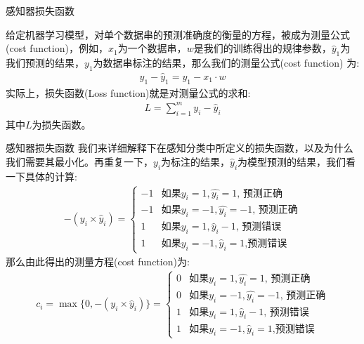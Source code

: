 \documentclass[handout]{ctexbeamer}
\begin{document}
\begin{frame}{感知器损失函数}
\begin{definition}
	给定机器学习模型，对单个数据串的预测准确度的衡量的方程，被成为测量公式(cost function)，例如，$x_1$为一个数据串，$w$是我们的训练得出的规律参数，$\hat{y}_1$为我们预测的结果，$y_1$为数据串标注的结果，那么我们的测量公式(cost function) 为:
	\begin{align*}
		y_1 - \hat{y}_1 = y_1 - x_1 \cdot w 
	\end{align*}
	实际上，损失函数(Loss function)就是对测量公式的求和:
	\begin{align*}
		L = \sum_{i=1}^m y_i - \hat{y}_i 
	\end{align*}
	其中$L$为损失函数。
\end{definition}
\end{frame}


\begin{frame}{感知器损失函数}
我们来详细解释下在感知分类中所定义的损失函数，以及为什么我们需要其最小化。再重复一下，$y_i$为标注的结果，$\hat{y}_i$为模型预测的结果，我们看一下具体的计算:
		\begin{align*}
				-(y_i \times \hat{y}_i) = \begin{cases}
					-1 & \text{如果$y_i = 1, \hat{y_i} = 1$, 预测正确} \\
					-1 & \text{如果$y_i = -1, \hat{y_i} = -1$, 预测正确} \\
					1 & \text{如果$y_i = 1, \hat{y}_i  -1$, 预测错误} \\
					1 & \text{如果$y_i = -1, \hat{y}_i = 1$,预测错误} 
				\end{cases}
		\end{align*}
	那么由此得出的测量方程(cost function)为:
		\begin{align*}
				c_i = \max \{ 0, -(y_i \times \hat{y}_i) \}  = \begin{cases}
					0 & \text{如果$y_i = 1, \hat{y_i} = 1$, 预测正确} \\
					0 & \text{如果$y_i = -1, \hat{y_i} = -1$, 预测正确} \\
					1 & \text{如果$y_i = 1, \hat{y}_i  -1$, 预测错误} \\
					1 & \text{如果$y_i = -1, \hat{y}_i = 1$,预测错误} 
				\end{cases}
		\end{align*}	
\end{frame}
\end{document}
